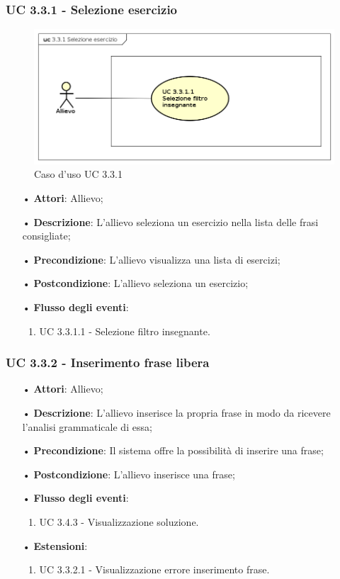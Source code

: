 \subsubsection{UC 3.3.1 - Selezione esercizio}
\begin{figure}
\centering
\includegraphics[width=17cm]{img/UC331.png} 
\caption{Caso d'uso UC 3.3.1}\label{fig:331}
\end{figure}

\begin{itemize}
\item[•]\textbf{Attori}: Allievo;
\item[•]\textbf{Descrizione}: L'allievo seleziona un esercizio nella lista delle frasi consigliate;
\item[•]\textbf{Precondizione}: L'allievo visualizza una lista di esercizi;
\item[•]\textbf{Postcondizione}: L'allievo seleziona un esercizio;
\item[•]\textbf{Flusso degli eventi}:
\begin{enumerate}
\item UC 3.3.1.1 - Selezione filtro insegnante.
\end{enumerate}
\end{itemize}


\subsubsection{UC 3.3.2 - Inserimento frase libera}
\begin{itemize}
	\item[•]\textbf{Attori}: Allievo;
	\item[•]\textbf{Descrizione}: L'allievo inserisce la propria frase in modo da ricevere l'analisi grammaticale di essa;
	\item[•]\textbf{Precondizione}: Il sistema offre la possibilità di inserire una frase;
	\item[•]\textbf{Postcondizione}: L'allievo inserisce una frase;
	\item[•]\textbf{Flusso degli eventi}:
	\begin{enumerate}
		\item UC 3.4.3 - Visualizzazione soluzione. %
	\end{enumerate}
	\item[•]\textbf{Estensioni}:
	\begin{enumerate}
		\item UC 3.3.2.1 - Visualizzazione errore inserimento frase. %
	\end{enumerate}
\end{itemize}


